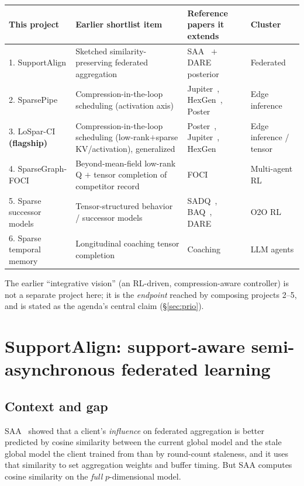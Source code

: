 \documentclass[11pt]{article}
\begin{document}
\begin{center}
\renewcommand{\arraystretch}{1.3}
\small
\begin{tabular}{@{}p{3.4cm}p{3.3cm}p{4.6cm}p{2.3cm}@{}}
\toprule
\textbf{This project} & \textbf{Earlier shortlist item} & \textbf{Reference papers it extends} & \textbf{Cluster} \\
\midrule
1. SupportAlign & Sketched similarity-preserving federated aggregation & SAA~\cite{saa} $+$ DARE posterior~\cite{dare} & Federated \\
2. SparsePipe & Compression-in-the-loop scheduling (activation axis) & Jupiter~\cite{jupiter}, HexGen~\cite{hexgen}, Poster~\cite{poster} & Edge inference \\
3. LoSpar-CI \textbf{(flagship)} & Compression-in-the-loop scheduling (low-rank$+$sparse KV/activation), generalized & Poster~\cite{poster}, Jupiter~\cite{jupiter}, HexGen~\cite{hexgen} & Edge inference / tensor \\
4. SparseGraph-FOCI & Beyond-mean-field low-rank Q $+$ tensor completion of competitor record & FOCI~\cite{foci} & Multi-agent RL \\
5. Sparse successor models & Tensor-structured behavior / successor models & SADQ~\cite{sadq}, BAQ~\cite{baq}, DARE~\cite{dare} & O2O RL \\
6. Sparse temporal memory & Longitudinal coaching tensor completion & Coaching~\cite{coaching} & LLM agents \\
\bottomrule
\end{tabular}
\end{center}

\noindent The earlier ``integrative vision'' (an RL-driven, compression-aware controller)
is not a separate project here; it is the \emph{endpoint} reached by composing projects
2--5, and is stated as the agenda's central claim (\S\ref{sec:prio}).

\section{SupportAlign: support-aware semi-asynchronous federated learning}
\label{sec:supportalign}

\subsection*{Context and gap}
SAA~\cite{saa} showed that a client's \emph{influence} on federated aggregation is better
predicted by cosine similarity between the current global model and the stale global model
the client trained from than by round-count staleness, and it uses that similarity to set
aggregation weights and buffer timing. But SAA computes cosine similarity on the
\emph{full} $p$-dimensional model.
\end{document}
